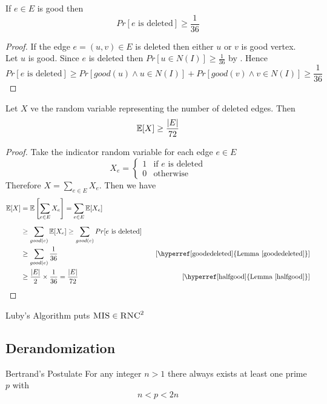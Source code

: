 \begin{lemma}\label{goodedeleted}
	If $e\in E$ is good then $$Pr[\text{$e$ is deleted}]\geq \frac1{36}$$
\end{lemma}
\begin{proof}
	If the edge $e=(u,v)\in E$ is deleted then either $u$ or $v$ is good vertex. Let $u$ is good. Since $e$ is deleted then $Pr[u\in N(I)]\geq \frac1{36}$ by . Hence $$Pr[\text{$e$ is deleted}]\geq Pr[good(u)\wedge u\in N(I)] + Pr[good(v)\wedge v\in N(I)]\geq \frac1{36}$$
\end{proof}

\begin{lemma}\label{edgedeleted}
	Let $X$ ve the random variable representing the number of deleted edges. Then $$\mathbb{E}[X]\geq \frac{|E|}{72}$$
\end{lemma}
\begin{proof}
	Take the indicator random variable for each edge $e\in E$ $$X_e=\begin{cases}
		1& \text{if $e$ is deleted}\\ 0 &\text{otherwise}
	\end{cases}$$
	Therefore $X=\sum\limits_{e\in E}X_e$. Then we have \begin{align*}
		\bbE[X] & = \bbE\lt[ \sum_{e\in E}X_e \rt] = \sum_{e\in E}\bbE[X_e]\\[2mm]
		& \geq \sum_{good(e)}\bbE[X_e]\geq \sum_{good(e)}Pr[\text{$e$ is deleted}]\\ 
		& \geq \sum_{good(e)}\frac1{36} &\quad [\text{\hyperref[goodedeleted]{Lemma \ref{goodedeleted}}}]\\
		& \geq \frac{|E|}{2}\times \frac1{36}=\frac{|E|}{72}&\quad [\text{\hyperref[halfgood]{Lemma \ref{halfgood}}}]
	\end{align*}
\end{proof}

\begin{theorem}
	Luby's Algorithm puts $\textsc{MIS}\in \textsc{RNC}^2$
\end{theorem}
\subsection{Derandomization}
\begin{theorem}{Bertrand's Postulate}\label{bertrand}
	For any integer $n>1$ there always exists at least one prime $p$ with $$n<p<2n$$
\end{theorem}

